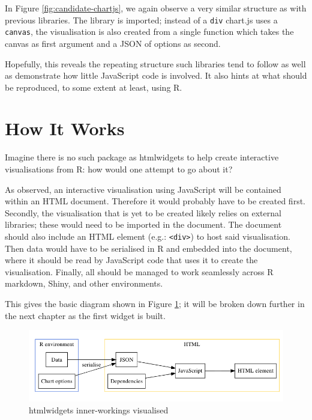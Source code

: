 \documentclass[10pt,]{krantz}
\begin{document}
In Figure \ref{fig:candidate-chartjs}, we again observe a very similar structure as with previous libraries. The library is imported; instead of a \texttt{div} chart.js uses a \texttt{canvas}, the visualisation is also created from a single function which takes the canvas as first argument and a JSON of options as second.

Hopefully, this reveals the repeating structure such libraries tend to follow as well as demonstrate how little JavaScript code is involved. It also hints at what should be reproduced, to some extent at least, using R.

\hypertarget{widgets-basics-inner-workings}{%
\section{How It Works}\label{widgets-basics-inner-workings}}

Imagine there is no such package as htmlwidgets to help create interactive visualisations from R: how would one attempt to go about it?

As observed, an interactive visualisation using JavaScript will be contained within an HTML document. Therefore it would probably have to be created first. Secondly, the visualisation that is yet to be created likely relies on external libraries; these would need to be imported in the document. The document should also include an HTML element (e.g.: \texttt{\textless{}div\textgreater{}}) to host said visualisation. Then data would have to be serialised in R and embedded into the document, where it should be read by JavaScript code that uses it to create the visualisation. Finally, all should be managed to work seamlessly across R markdown, Shiny, and other environments.

This gives the basic diagram shown in Figure \ref{fig:widget-inner-diagram}; it will be broken down further in the next chapter as the first widget is built.

\begin{figure}[H]

{\centering \includegraphics[width=1\linewidth]{images/03-htmlwidget-viz} 

}

\caption{htmlwidgets inner-workings visualised}\label{fig:widget-inner-diagram}
\end{figure}
\end{document}

